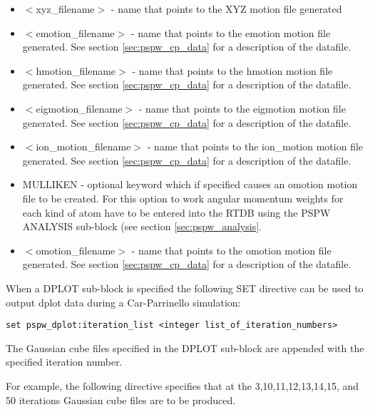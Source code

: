 \begin{itemize}
        \item $<$xyz\_filename$>$ - name that points to the XYZ motion file
                                generated
        \item $<$emotion\_filename$>$ - name that points to the emotion motion file
                                generated. See section \ref{sec:pspw_cp_data} for a 
                                description of the datafile.
        \item $<$hmotion\_filename$>$ - name that points to the hmotion motion file
                                generated. See section \ref{sec:pspw_cp_data} for a 
                                description of the datafile.
        \item $<$eigmotion\_filename$>$ - name that points to the eigmotion motion file
                                generated. See section \ref{sec:pspw_cp_data} for a 
                                description of the datafile.
        \item $<$ion\_motion\_filename$>$ - name that points to the ion\_motion motion file
                                generated. See section \ref{sec:pspw_cp_data} for a 
                                description of the datafile.
       \item MULLIKEN - optional keyword which if specified
                         causes an omotion motion file to be created.  For this option
                         to work angular momentum weights for each kind
                         of atom have to be entered into the RTDB using
                         the PSPW ANALYSIS sub-block (see section \ref{sec:pspw_analysis}.
        \item $<$omotion\_filename$>$ - name that points to the omotion motion file
                                generated. See section \ref{sec:pspw_cp_data} for a 
                                description of the datafile.
\end{itemize}

When a DPLOT sub-block is specified the following SET directive can be used 
to output dplot data during a Car-Parrinello simulation:
\begin{verbatim}
set pspw_dplot:iteration_list <integer list_of_iteration_numbers>
\end{verbatim}
The Gaussian cube files specified in the DPLOT sub-block are appended
with the specified iteration number. 

For example, the following directive specifies that at the 
3,10,11,12,13,14,15, and 50 iterations Gaussian cube files are to be produced.

